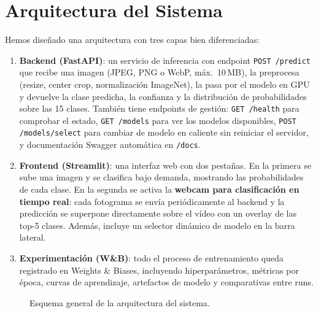 \documentclass[11pt,a4paper]{article}
\begin{document}
\section{Arquitectura del Sistema}

Hemos diseñado una arquitectura con tres capas bien diferenciadas:

\begin{enumerate}
    \item \textbf{Backend (FastAPI)}: un servicio de inferencia con endpoint \texttt{POST /predict} que recibe una imagen (JPEG, PNG o WebP, máx.\ 10\,MB), la preprocesa (resize, center crop, normalización ImageNet), la pasa por el modelo en GPU y devuelve la clase predicha, la confianza y la distribución de probabilidades sobre las 15 clases. También tiene endpoints de gestión: \texttt{GET /health} para comprobar el estado, \texttt{GET /models} para ver los modelos disponibles, \texttt{POST /models/select} para cambiar de modelo en caliente sin reiniciar el servidor, y documentación Swagger automática en \texttt{/docs}.

    \item \textbf{Frontend (Streamlit)}: una interfaz web con dos pestañas. En la primera se sube una imagen y se clasifica bajo demanda, mostrando las probabilidades de cada clase. En la segunda se activa la \textbf{webcam para clasificación en tiempo real}: cada fotograma se envía periódicamente al backend y la predicción se superpone directamente sobre el vídeo con un overlay de las top-5 clases. Además, incluye un selector dinámico de modelo en la barra lateral.

    \item \textbf{Experimentación (W\&B)}: todo el proceso de entrenamiento queda registrado en Weights \& Biases, incluyendo hiperparámetros, métricas por época, curvas de aprendizaje, artefactos de modelo y comparativas entre runs.
\end{enumerate}

\begin{figure}[H]
\centering
{}
\caption{Esquema general de la arquitectura del sistema.}
\label{fig:arch}
\end{figure}
\end{document}
